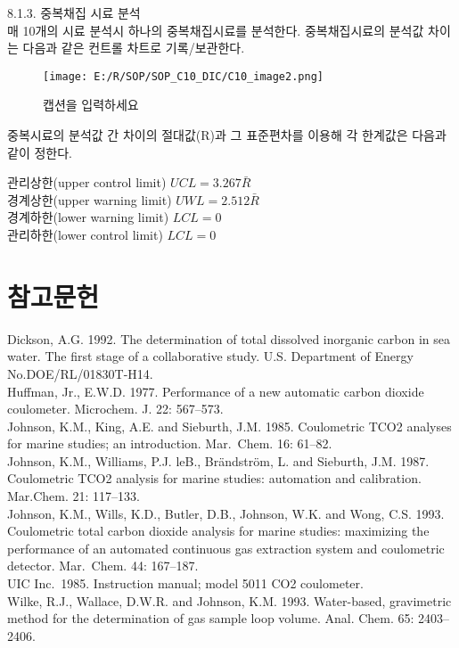 \documentclass[
]{book}
\begin{document}
8.1.3. 중복채집 시료 분석\\
매 10개의 시료 분석시 하나의 중복채집시료를 분석한다. 중복채집시료의 분석값 차이는 다음과 같은 컨트롤 차트로 기록/보관한다.

\begin{figure}
\centering
\texttt{[image: E:/R/SOP/SOP\_C10\_DIC/C10\_image2.png]}
\caption{캡션을 입력하세요}
\end{figure}

중복시료의 분석값 간 차이의 절대값(R)과 그 표준편차를 이용해 각 한계값은 다음과 같이 정한다.

관리상한(upper control limit) \(UCL=3.267\bar{R}\)\\
경계상한(upper warning limit) \(UWL=2.512\bar{R}\)\\
경계하한(lower warning limit) \(LCL=0\)\\
관리하한(lower control limit) \(LCL=0\)

\hypertarget{uxcc38uxace0uxbb38uxd5cc-6}{%
\section{참고문헌}\label{uxcc38uxace0uxbb38uxd5cc-6}}

Dickson, A.G. 1992. The determination of total dissolved inorganic carbon in sea water. The first stage of a collaborative study. U.S. Department of Energy No.DOE/RL/01830T-H14.\\
Huffman, Jr., E.W.D. 1977. Performance of a new automatic carbon dioxide coulometer. Microchem. J. 22: 567--573.\\
Johnson, K.M., King, A.E. and Sieburth, J.M. 1985. Coulometric TCO2 analyses for marine studies; an introduction. Mar.~Chem. 16: 61--82.\\
Johnson, K.M., Williams, P.J. leB., Brändström, L. and Sieburth, J.M. 1987. Coulometric TCO2 analysis for marine studies: automation and calibration. Mar.Chem. 21: 117--133.\\
Johnson, K.M., Wills, K.D., Butler, D.B., Johnson, W.K. and Wong, C.S. 1993. Coulometric total carbon dioxide analysis for marine studies: maximizing the performance of an automated continuous gas extraction system and coulometric detector. Mar.~Chem. 44: 167--187.\\
UIC Inc.~1985. Instruction manual; model 5011 CO2 coulometer.\\
Wilke, R.J., Wallace, D.W.R. and Johnson, K.M. 1993. Water-based, gravimetric method for the determination of gas sample loop volume. Anal. Chem. 65: 2403--2406.

  
\end{document}

